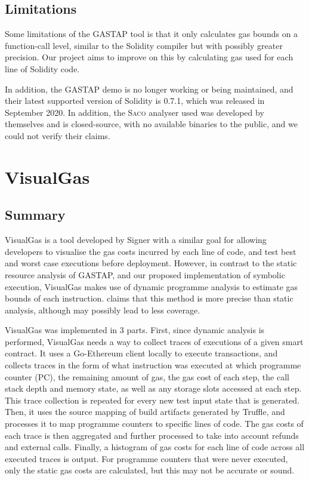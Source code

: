 \subsection{Limitations}

Some limitations of the GASTAP tool is that it only calculates gas bounds on a function-call level,
similar to the Solidity compiler but with possibly greater precision. Our project aims to improve on
this by calculating gas used for each line of Solidity code. 

In addition, the GASTAP demo is no longer
working or being maintained, and their latest supported version of Solidity is 0.7.1, which was released
in September 2020. In addition, the \textsc{Saco} analyser used was developed by themselves and is
closed-source, with no available binaries to the public, and we could not verify their claims.

\section{VisualGas}

\subsection{Summary}

VisualGas is a tool developed by Signer \cite{visualgas} with a similar goal for allowing developers 
to visualise the gas costs incurred by each line of code, and test best and worst case executions
before deployment. However, in contrast to the static resource analysis of GASTAP, and our
proposed implementation of symbolic execution, VisualGas makes use of dynamic programme analysis
to estimate gas bounds of each instruction. \cite{visualgas} claims that this method is more precise
than static analysis, although may possibly lead to less coverage.

VisualGas was implemented in 3 parts. First, since dynamic analysis is performed, VisualGas needs 
a way to collect traces of executions of a given smart contract. It uses a Go-Ethereum client 
locally to execute transactions, and collects traces in the form of what instruction was
executed at which programme counter (PC), the remaining amount of gas, the gas cost of each step,
the call stack depth and memory state, as well as any storage slots accessed at each step. This trace
collection is repeated for every new test input state that is generated. Then,
it uses the source mapping of build artifacts generated by Truffle, and processes it to map
programme counters to specific lines of code. The gas costs of each trace is then aggregated 
and further processed to take into account refunds and external calls. Finally, a histogram of
gas costs for each line of code across all executed traces is output. For programme counters that were
never executed, only the static gas costs are calculated, but this may not be accurate or sound.

